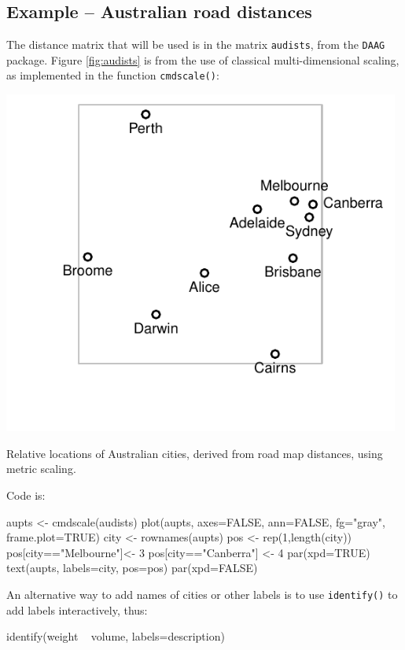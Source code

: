 \documentclass{tufte-book}\usepackage[]{graphicx}\usepackage[]{color}
\newcommand{\txtt}[1]{\texttt{#1}}
\begin{document}
\subsection*{Example -- Australian road distances}
The distance matrix that will be used is in the matrix \txtt{audists},
from the \txtt{DAAG} package.  Figure \ref{fig:audists} is from the
use of classical multi-dimensional scaling, as implemented in the
function \txtt{cmdscale()}:
\begin{marginfigure}
\begin{Schunk}


\centerline{\includegraphics[width=0.98\textwidth]{figs/12-aupoints-1} }

\end{Schunk}
\caption{Relative locations of Australian cities, derived from road
  map distances, using metric scaling.\label{fig:audists}}
\end{marginfigure}
Code is:
\begin{Schunk}
\begin{Sinput}
aupts <- cmdscale(audists)
plot(aupts, axes=FALSE, ann=FALSE, fg="gray",
     frame.plot=TRUE)
city <- rownames(aupts)
pos <- rep(1,length(city))
pos[city=="Melbourne"]<- 3
pos[city=="Canberra"] <- 4
par(xpd=TRUE)
text(aupts, labels=city, pos=pos)
par(xpd=FALSE)
\end{Sinput}
\end{Schunk}

\noindent
An alternative way to add names of cities or other labels is to use
\txtt{identify()} to add labels interactively, thus:
\begin{Schunk}
\begin{Sinput}
identify(weight ~ volume, labels=description)
\end{Sinput}
\end{Schunk}
\end{document}
